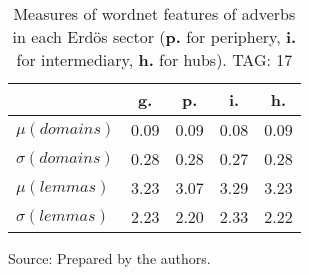 \begin{table}[h!]
\begin{center}
\caption{Measures of wordnet features of adverbs in each Erd\"os sector ({{\bf p.}} for periphery, {{\bf i.}} for intermediary, {{\bf h.}} for hubs). TAG: 17}
	\label{tab:wnr}
\begin{tabular}{| l || c | c | c | c |}\hline
 & {\bf g.} & {\bf p.} & {\bf i.} & {\bf h.} \\\hline\hline
$\mu(domains)$ & 0.09  & 0.09  & 0.08  & 0.09 \\
$\sigma(domains)$ & 0.28  & 0.28  & 0.27  & 0.28 \\\hline
$\mu(lemmas)$ & 3.23  & 3.07  & 3.29  & 3.23 \\
$\sigma(lemmas)$ & 2.23  & 2.20  & 2.33  & 2.22 \\\hline
\end{tabular}
\begin{flushleft}
		Source: Prepared by the authors.\
\end{flushleft}
\end{center}
\end{table}
